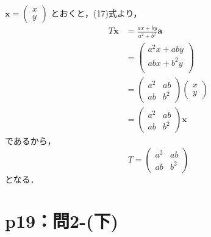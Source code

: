 \begin{tanswer}
  $\bm{x} =
    \begin{pmatrix}
      x \\
      y
    \end{pmatrix}
  $
  とおくと，(17)式より，
  \begin{align*}
    T \bm{x} & = \frac{ax+by}{a^2+b^2} \bm{a} \\
             & =
    \begin{pmatrix}
      a^2x +aby   \\
      ab x + b^2y \\
    \end{pmatrix}
    \\
             & =
    \begin{pmatrix}
      a^2 & ab  \\
      ab  & b^2
    \end{pmatrix}
    \begin{pmatrix}
      x \\
      y
    \end{pmatrix}
    \\
             & =
    \begin{pmatrix}
      a^2 & ab  \\
      ab  & b^2
    \end{pmatrix}
    \bm{x}
  \end{align*}
  であるから，
  \[
    T=\begin{pmatrix}
      a^2 & ab  \\
      ab  & b^2
    \end{pmatrix}
  \]
  となる．
\end{tanswer}
%


\section*{p19：問2-(下)}


